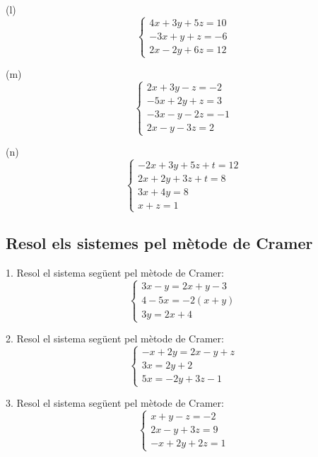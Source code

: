 \documentclass[12pt]{article}
\begin{document}
\begin{exercici}
(l) 
\[
\begin{cases}
4x + 3y + 5z = 10 \\
-3x + y + z = -6 \\
2x - 2y + 6z = 12
\end{cases}
\]
\end{exercici}

\begin{exercici}
(m) 
\[
\begin{cases}
2x + 3y - z = -2 \\
-5x + 2y + z = 3 \\
-3x - y - 2z = -1 \\
2x - y - 3z = 2
\end{cases}
\]
\end{exercici}

\begin{exercici}
(n) 
\[
\begin{cases}
-2x + 3y + 5z + t = 12 \\
2x + 2y + 3z + t = 8 \\
3x + 4y = 8 \\
x + z = 1
\end{cases}
\]
\end{exercici}


\subsection*{Resol els sistemes pel mètode de Cramer}

\begin{exercici}
1. Resol el sistema següent pel mètode de Cramer:
\[
\begin{cases}
3x - y = 2x + y - 3 \\
4 - 5x = -2(x + y) \\
3y = 2x + 4
\end{cases}
\]
\end{exercici}

\begin{exercici}
2. Resol el sistema següent pel mètode de Cramer:
\[
\begin{cases}
-x + 2y = 2x - y + z \\
3x = 2y + 2 \\
5x = -2y + 3z - 1
\end{cases}
\]
\end{exercici}

\begin{exercici}
3. Resol el sistema següent pel mètode de Cramer:
\[
\begin{cases}
x + y - z = -2 \\
2x - y + 3z = 9 \\
-x + 2y + 2z = 1
\end{cases}
\]
\end{exercici}
\end{document}
